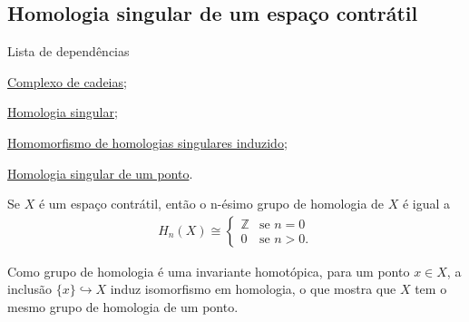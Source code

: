 \subsection{Homologia singular de um espaço contrátil} %
\label{homologia-singular-de-um-espaco-contratil-prop}
\begin{titlemize}{Lista de dependências}
	\item \hyperref[complexo-de-cadeias-def]{Complexo de cadeias};\\ 
    \item \hyperref[homologia-singular-def]{Homologia singular};\\
    \item \hyperref[homomorfismo-de-homologias-singulares-induzido-prop]{Homomorfismo de homologias singulares induzido};\\
    \item \hyperref[homologia-singular-de-um-ponto-prop]{Homologia singular de um ponto}.
\end{titlemize}

\begin{prop}
    Se $X$ é um espaço contrátil, então o n-ésimo grupo de homologia de $X$ é igual a
    \begin{align*}
        H_n(X)\cong\begin{cases}
            \mathbb{Z}&\text{se }n=0\\
            0&\text{se }n>0.
        \end{cases}
    \end{align*}
\end{prop}

\begin{dem}
    Como grupo de homologia é uma invariante homotópica, para um ponto $x\in X$, a inclusão $\{x\}\hookrightarrow X$ induz isomorfismo em homologia, o que mostra que $X$ tem o mesmo grupo de homologia de um ponto.
\end{dem}
    
